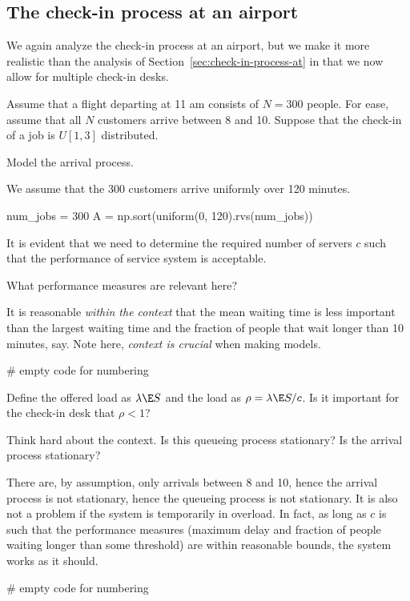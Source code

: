 \subsection{The check-in process at an airport}
\label{sec:check-in-process}

We again analyze the check-in process at an airport, but we make it more realistic than the analysis of Section~\ref{sec:check-in-process-at} in that we now allow for multiple check-in desks.

Assume that a flight departing at 11 am  consists of $N=300$ people.  For ease, assume that all $N$ customers arrive between 8 and 10. Suppose that the check-in of a job is $U[1, 3]$ distributed. 


\begin{exercise}
  Model the arrival process.
\begin{solution}
We assume that the 300 customers arrive uniformly over 120 minutes. 
\begin{pyverbatim}
num_jobs = 300
A = np.sort(uniform(0, 120).rvs(num_jobs))
\end{pyverbatim}
  \end{solution}
\end{exercise}

It is evident that we need to determine the required number of servers $c$ such that the performance of service system is acceptable.

\begin{exercise}
  What performance measures are relevant here?
\begin{solution}
    It is reasonable \emph{within the context} that the mean waiting time is less important than the largest waiting time and the fraction of people that wait longer than 10 minutes, say.
    Note here, \emph{context is crucial} when making models.
\begin{pyverbatim}
# empty code for numbering
\end{pyverbatim}
  \end{solution}
\end{exercise}

\begin{exercise}
  Define the offered load as $\lambda \E S$ and the load as $\rho = \lambda \E S/ c$. Is it important for the check-in desk that $\rho<1$?

\begin{hint}
    Think hard about the context. Is this queueing process stationary? Is the arrival process stationary?
\end{hint}
\begin{solution}
  There are, by assumption, only arrivals between 8 and 10, hence the arrival process is not stationary, hence the queueing process is not stationary.
  It is also not a problem if the system is temporarily in overload.
  In fact, as long as $c$ is such that the performance measures (maximum delay and fraction of people waiting longer than some threshold) are within reasonable bounds, the system works as it should.
\begin{pyverbatim}
# empty code for numbering
\end{pyverbatim}
  \end{solution}
\end{exercise}

